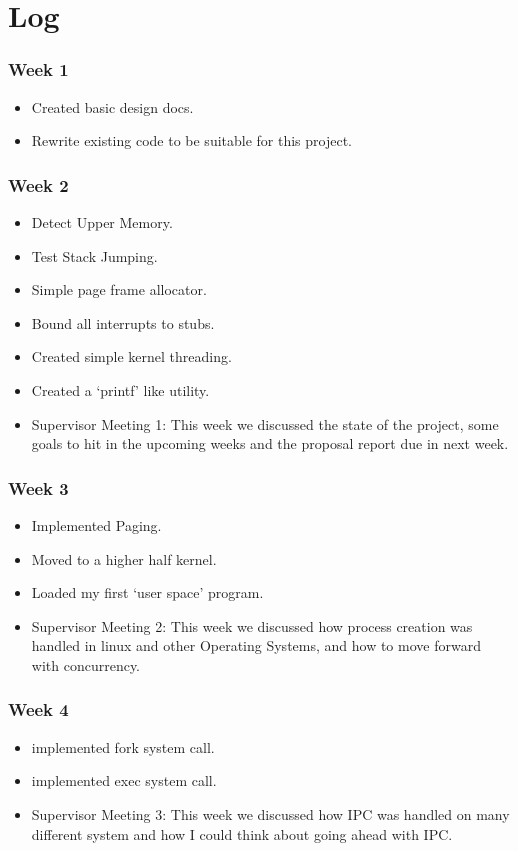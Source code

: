 \documentclass[a4paper]{report}
\begin{document}
\chapter*{Log}


\subsection*{Week 1}
\begin{itemize}
\item Created basic design docs.
\item Rewrite existing code to be suitable for this project.
\end{itemize}

\subsection*{Week 2}
\begin{itemize}
\item Detect Upper Memory.
\item Test Stack Jumping.
\item Simple page frame allocator.
\item Bound all interrupts to stubs.
\item Created simple kernel threading.
\item Created a `printf' like utility.
\item Supervisor Meeting 1: This week we discussed the state of the project, some goals to hit in the upcoming weeks and the proposal report due in next week.
\end{itemize}

\subsection*{Week 3}
\begin{itemize}
\item Implemented Paging.
\item Moved to a higher half kernel.
\item Loaded my first `user space' program.
\item Supervisor Meeting 2: This week we discussed how process creation was handled in linux and other Operating Systems, and how to move forward with concurrency.
\end{itemize}

\subsection*{Week 4}
\begin{itemize}
\item implemented fork system call.
\item implemented exec system call.
\item Supervisor Meeting 3: This week we discussed how IPC was handled on many different system and how I could think about going ahead with IPC.
\end{itemize}
\end{document}
